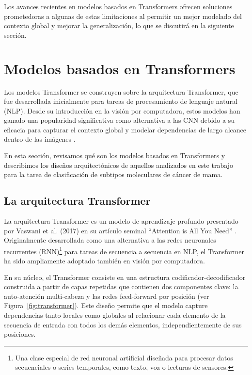 \documentclass[a4paper,10pt]{book}
\begin{document}
Los avances recientes en modelos basados en Transformers ofrecen soluciones prometedoras a algunas de estas limitaciones al permitir un mejor modelado del contexto global y mejorar la generalización, lo que se discutirá en la siguiente sección.

\section{Modelos basados en Transformers}

Los modelos Transformer se construyen sobre la arquitectura Transformer, que fue desarrollada inicialmente para tareas de procesamiento de lenguaje natural (NLP). Desde su introducción en la visión por computadora, estos modelos han ganado una popularidad significativa como alternativa a las CNN debido a su eficacia para capturar el contexto global y modelar dependencias de largo alcance dentro de las imágenes \cite{pereira_review_2024}.

En esta sección, revisamos qué son los modelos basados en Transformers y describimos los diseños arquitectónicos de aquellos analizados en este trabajo para la tarea de clasificación de subtipos moleculares de cáncer de mama.

\subsection{La arquitectura Transformer}

La arquitectura Transformer es un modelo de aprendizaje profundo presentado por Vaswani et al. (2017) en su artículo seminal “Attention is All You Need” \cite{vaswani_attention_2017}. Originalmente desarrollada como una alternativa a las redes neuronales recurrentes (RNN)\footnote{Una clase especial de red neuronal artificial diseñada para procesar datos secuenciales o series temporales, como texto, voz o lecturas de sensores.} para tareas de secuencia a secuencia en NLP, el Transformer ha sido ampliamente adoptado también en visión por computadora.

En su núcleo, el Transformer consiste en una estructura codificador-decodificador construida a partir de capas repetidas que contienen dos componentes clave: la auto-atención multi-cabeza y las redes feed-forward por posición (ver Figura~\ref{fig:transformer}). Este diseño permite que el modelo capture dependencias tanto locales como globales al relacionar cada elemento de la secuencia de entrada con todos los demás elementos, independientemente de sus posiciones.
\end{document}
